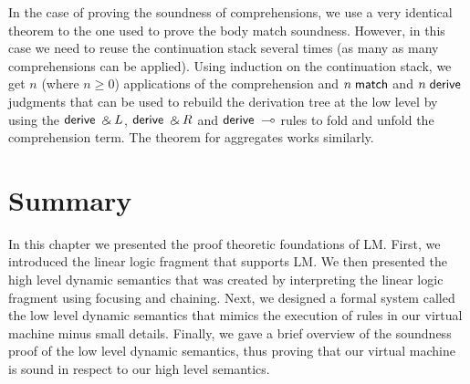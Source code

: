 In the case of proving the soundness of comprehensions, we use a very identical theorem to the one used
to prove the body match soundness. However, in this case we need to reuse the continuation stack several
times (as many as many comprehensions can be applied). Using induction on the continuation stack, we get
$n$ (where $n \ge 0$) applications of the comprehension and $n \; \mathsf{match}$ and $n \; \mathsf{derive}$ judgments
that can be used to rebuild the derivation tree at the low level by using the $\mathsf{derive} \; \mathbin{\binampersand} L$, $\mathsf{derive} \; \mathbin{\binampersand} R$
and $\mathsf{derive} \; \multimap$ rules to fold and unfold the comprehension term. The theorem for aggregates works similarly.

\section{Summary}

In this chapter we presented the proof theoretic foundations of LM.
First, we introduced the linear logic fragment that supports LM. We then presented the
high level dynamic semantics that was created by interpreting the linear logic fragment using
focusing and chaining. Next, we designed
a formal system called the low level dynamic semantics that mimics the execution of rules in
our virtual machine minus small details.
Finally, we gave a brief overview of the soundness proof of the low level dynamic semantics,
thus proving that our virtual machine is sound in respect to our high level semantics.

